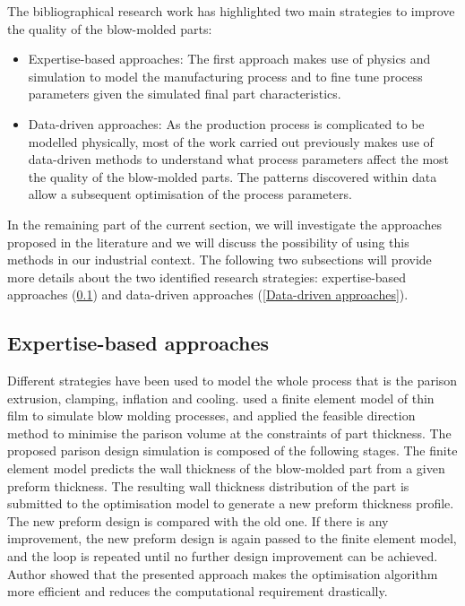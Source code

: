 The bibliographical research work has highlighted two main strategies to improve the quality of the blow-molded parts:

\begin{itemize}
    \item Expertise-based approaches: The first approach makes use of physics and simulation to model the manufacturing process and to fine tune process parameters given the simulated final part characteristics. 
    \item Data-driven approaches: As the production process is complicated to be modelled physically, most of the work carried out previously makes use of data-driven methods to understand what process parameters affect the most the quality of the blow-molded parts. The patterns discovered within data allow a subsequent optimisation of the process parameters.
\end{itemize}


In the remaining part of the current section, we will investigate the approaches proposed in the literature and we will discuss the possibility of using this methods in our industrial context. The following two subsections will provide more details about the two identified research strategies: expertise-based approaches (\ref{Expertise-based approaches}) and data-driven approaches (\ref{Data-driven approaches}). 

\subsection{Expertise-based approaches} \label{Expertise-based approaches}

Different strategies have been used to model the whole process that is the parison extrusion, clamping, inflation and cooling. \citep{lee1996prediction} used a finite element model of thin film to simulate blow molding processes, and applied the feasible direction method to minimise the parison volume at the constraints of part thickness. The proposed parison design simulation is composed of the following stages. The finite element model predicts the wall thickness of the blow-molded part from a given preform thickness. The resulting wall thickness distribution of the part is submitted to the optimisation model to generate a new preform thickness profile. The new preform design is compared with the old one. If there is any improvement, the new preform design is again passed to the finite element model, and the loop is repeated until no further design improvement can be achieved. Author showed that the presented approach makes the optimisation algorithm more efficient and reduces the computational requirement drastically. 

